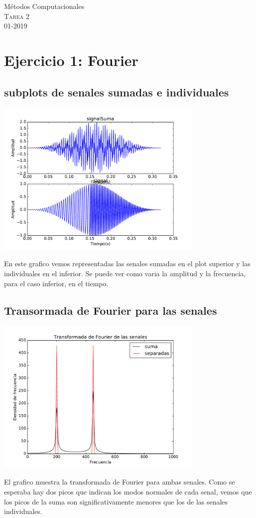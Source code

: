 \documentclass[11pt,letterpaper]{exam}
\begin{document}
\begin{center}
{\Large Métodos Computacionales} \\
\textsc{Tarea 2}\\
01-2019\\
\end{center}

\noindent
\section{Ejercicio 1: Fourier}
\subsection{subplots de senales sumadas e individuales} 
\begin{center}
\includegraphics[width=10cm]{signal_subplots.pdf} 
\end{center}
En este grafico vemos representadas las senales sumadas en el plot superior y las individuales en el inferior. Se puede ver como varia la amplitud y la frecuencia, para el caso inferior, en el tiempo.

\subsection{Transormada de Fourier para las senales}
\begin{center}
\includegraphics[width=10cm]{Fourier_senales.pdf} 
\end{center}
El grafico muestra la transformada de Fourier para ambas senales. Como se esperaba hay dos picos que indican los modos normales de cada senal, vemos que los picos de la suma son significativamente menores que los de las senales individuales.
\end{document}
